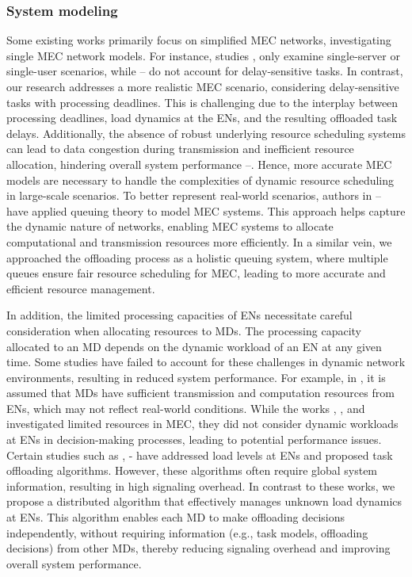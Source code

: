 \documentclass[10pt, journal,letterpaper]{IEEEtran}
\begin{document}
  \subsubsection{System modeling}

Some existing works primarily focus on simplified MEC networks, investigating single MEC network models. For instance, studies \cite{zhou2021deep}, \cite{liu2021learn} only examine single-server or single-user scenarios, while \cite{huang2019deep}--\cite{wu2023computation} do not account for delay-sensitive tasks. In contrast, our research addresses a more realistic MEC scenario, considering delay-sensitive tasks with processing deadlines. This is challenging due to the interplay between processing deadlines, load dynamics at the ENs, and the resulting offloaded task delays. Additionally, the absence of robust underlying resource scheduling systems can lead to data congestion during transmission and inefficient resource allocation, hindering overall system performance \cite{wang2020reinforcement}--\cite{chen2021drl}. Hence, more accurate MEC models are necessary to handle the complexities of dynamic resource scheduling in large-scale scenarios.
To better represent real-world scenarios, authors in \cite{Bolourian-WCL24}--\cite{9253665} have applied queuing theory to model MEC systems. This approach helps capture the dynamic nature of networks, enabling MEC systems to allocate computational and transmission resources more efficiently. In a similar vein, we approached the offloading process as a holistic queuing system, where multiple queues ensure fair resource scheduling for MEC, leading to more accurate and efficient resource management.

In addition, the limited processing capacities of ENs necessitate careful consideration when allocating resources to MDs. The processing capacity allocated to an MD depends on the dynamic workload of an EN at any given time. Some studies have failed to account for these challenges in dynamic network environments, resulting in reduced system performance. For example, in \cite{chen2021drl}, it is assumed that MDs have sufficient transmission and computation resources from ENs, which may not reflect real-world conditions. While the works \cite{zhao2019deep}, \cite{dai2020edge}, and \cite{wu2024privacy} investigated limited resources in MEC, they did not consider dynamic workloads at ENs in decision-making processes, leading to potential performance issues.
Certain studies such as \cite{sun2024hierarchical}, \cite{gong2022edge}-\cite{gao2022large} have addressed load levels at ENs and proposed task offloading algorithms. However, these algorithms often require global system information, resulting in high signaling overhead. In contrast to these works, we propose a distributed algorithm that effectively manages unknown load dynamics at ENs. This algorithm enables each MD to make offloading decisions independently, without requiring information (e.g., task models, offloading decisions) from other MDs, thereby reducing signaling overhead and improving overall system performance.
\end{document}
